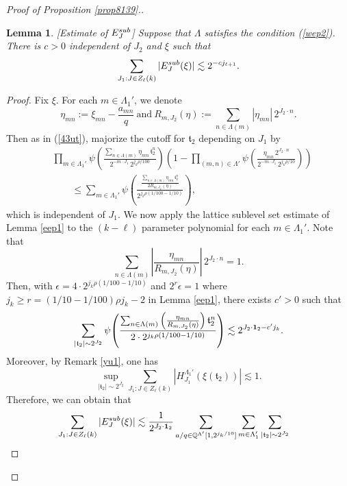 \documentclass[10pt,a4paper]{amsart}
\newtheorem{lemma}{Lemma}\numberwithin{lemma}{section}
\numberwithin{equation}{section}
\begin{document}
\begin{proof}[Proof of Proposition \ref{prop8139}.]
\begin{lemma}\label{lem57b9}[Estimate of $E_J^{\rm{sub}}$] Suppose that $\Lambda$ satisfies   the  condition (\ref{wep2}). There is $c>0$ independent of $J_2$ and $\xi$ such that 
\begin{align*}
	\sum_{J_1:J\in Z_{\ell}(k)} |E^{\rm{sub}}_J(\xi)| \lesssim 2^{-cj_{\ell+1}}.
\end{align*}
\end{lemma}
\begin{proof}
Fix $\xi$. For each $m\in \Lambda_1'$,  we denote
	$$\eta_{mn}:=\xi_{mn}-\frac{a_{mn}}{q}\ \text{and}\ R_{m,J_2}(\eta):=\sum_{n\in\Lambda(m)} |\eta_{mn}|\, 2^{J_2 \cdot n}. $$ Then as in (\ref{43ut}), majorize the cutoff for $\mathfrak{t}_2$ depending on $J_1$ by  
	\begin{align*} 
		&\prod_{m\in\Lambda_1'}
		\psi\!\left(
		\frac{\sum_{n\in\Lambda(m)} \eta_{mn}\, \mathfrak{t}_2^n}
		{2^{-m\cdot J_1}\, 2^{j_{k}\rho /100}}
		\right)
		\left(
		1-
		\prod_{(m,n)\in\Lambda'}
		\psi\!\left(
		\frac{\eta_{mn}\, 2^{J_2\cdot n}}
		{2^{-m\cdot  J_1}\, 2^{j_k\rho /10}}
		\right)
		\right) \\
&\qquad \le
		\sum_{m\in\Lambda_1'}
		\psi\!\left(
		\frac{
			\displaystyle
			\frac{\sum_{n\in\Lambda(m)} \eta_{mn}\, \mathfrak{t}_2^n}
			{2R_{m,J_2}(\eta)}
		}
		{ 2^{j_k\rho  (1/100-1/10)}}
		\right),\nonumber
	\end{align*}
	which is independent of $J_1$. 
We now apply the lattice sublevel set estimate of Lemma \ref{eep1} to the $(k-\ell)$ parameter polynomial for  each  $m\in \Lambda_1'$. Note that $$ \sum_{n\in\Lambda(m)} \left|\frac{\eta_{mn}}{R_{m,J_2}(\eta)}\right| \, 2^{J_2\cdot n}=1.$$ Then,
	with $\epsilon=4\cdot 2^{j_k\rho  (1/100-1/10)} $  and $2^r\epsilon =1$ where $j_k\ge r=(1/10-1/100)\rho  j_k-2$ in Lemma \ref{eep1},  there exists $c'>0$ such that
	$$ \sum_{|\mathfrak{t}_2|\sim 2^{J_2}}   
	\psi\!\left(
	\frac{
		\sum_{n\in\Lambda(m)} \left(\frac{\eta_{mn}}{R_{m,J_2}(\eta)} \right)\mathfrak{t}_2^n
	}
	{ 2\cdot 2^{j_k \rho  (1/100-1/10)}}
	\right)\lesssim 2^{J_2\cdot {\bf 1}_2- c' j_k}. $$ Moreover, by Remark \ref{yu1}, one has $$ \sup_{|\mathfrak{t}_2|\sim 2^{J_2}} \sum_{J_1:J\in Z_\ell(k)}\left| H^{\Lambda_{1}'}_{J_{1}}\left(\xi(\mathfrak{t}_2) \right)\right|\lesssim 1.$$ Therefore,    we can obtain that
	\begin{align*}
	\sum_{J_1:J\in Z_{\ell}(k)} |E^{\rm{sub}}_J(\xi)| &\lesssim  \frac{1}{2^{J_2\cdot {\bf 1}_2}}
	 \sum_{ a/q\in \mathbb{Q}^{\Lambda'}[1,2^{j_k/10}]}  	\sum_{m\in\Lambda_1'} \sum_{|\mathfrak{t}_2|\sim  2^{J_2}}    

\end{align*}
\end{proof}
\end{proof}
\end{document}
